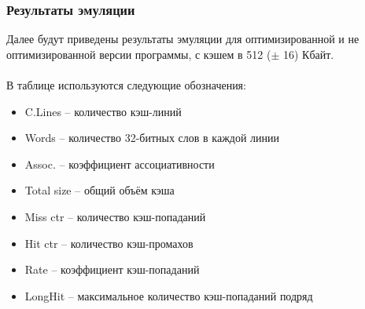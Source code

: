 \documentclass{beamer}
\begin{document}

\begin{frame}
\frametitle{Результаты эмуляции}

Далее будут приведены результаты эмуляции для оптимизированной и не оптимизированной версии программы, с кэшем в 512 ($\pm$ 16) Кбайт.\\~\\

В таблице используются следующие обозначения:
\begin{itemize}
\item C.Lines -- количество кэш-линий
\item Words -- количество 32-битных слов в каждой линии
\item Assoc. -- коэффициент ассоциативности
\item Total size -- общий объём кэша
\item Miss ctr -- количество кэш-попаданий
\item Hit ctr -- количество кэш-промахов
\item Rate -- коэффициент кэш-попаданий
\item LongHit -- максимальное количество кэш-попаданий подряд
\end{itemize}

\end{frame}

\end{document}
